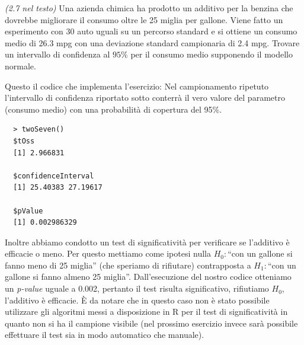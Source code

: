 \begin{exercise}{\emph{(2.7 nel testo)}}
  Una azienda chimica ha prodotto un additivo per la benzina che
  dovrebbe migliorare il consumo oltre le 25 miglia per
  gallone. Viene fatto un esperimento con 30 auto uguali su un
  percorso standard e si ottiene un consumo medio di 26.3 mpg con una
  deviazione standard campionaria di 2.4 mpg. Trovare un intervallo di
  confidenza al $95\%$ per il consumo medio supponendo il modello normale.
\end{exercise}
Questo il codice che implementa l'esercizio:
 Nel
campionamento ripetuto l'intervallo di confidenza riportato sotto
conterr\`a il vero valore del parametro (consumo medio) con una
probabilit\`a di copertura del 95\%.
\begin{lstlisting}
  > twoSeven()
  $tOss
  [1] 2.966831

  $confidenceInterval
  [1] 25.40383 27.19617

  $pValue
  [1] 0.002986329
\end{lstlisting}
Inoltre abbiamo condotto un test di significativit\`a per verificare
se l'additivo \`e efficacie o meno. Per questo mettiamo come ipotesi
nulla $H_0:$``con un gallone si fanno meno di 25 miglia'' (che
speriamo di rifiutare) contrapposta a $H_1:$``con un gallone si fanno
almeno 25 miglia''. Dall'esecuzione del nostro codice otteniamo un
\emph{p-value} uguale a 0.002, pertanto il test risulta significativo,
rifiutiamo $H_0$, l'additivo \`e efficacie. \`E da notare che in
questo caso non \`e stato possibile utilizzare gli algoritmi messi a
disposizione in R per il test di significativit\`a in quanto non si ha
il campione visibile (nel prossimo esercizio invece sar\`a possibile
effettuare il test sia in modo automatico che manuale).

